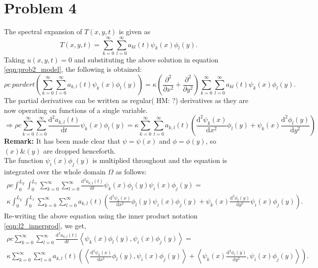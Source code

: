 \documentclass[12pt]{article}
\newcommand{\HM}[1]{{\color{green} HM: #1}}
\newcommand{\parder}[2]{\frac{\partial #1}{\partial #2}}
\newcommand{\der}[2]{\frac{\mathrm{d} #1}{\mathrm{d} #2}}
\newcommand{\dotprod}[2]{\left\langle #1, #2 \right\rangle}
\begin{document}
\section*{Problem 4}
The spectral expansion of $T(x,y,t)$ is given as
\begin{equation}
T(x,y,t) = \sum_{k=0}^\infty\sum_{l=0}^\infty a_{kl}(t)\psi_k(x)\phi_l(y).
\end{equation}
Taking $u(x,y,t) = 0$ and substituting the above solution in equation \eqref{eqn:prob2_model}, the following is obtained:
\begin{equation}
\rho c\ parder{ }{t} \left(\sum_{k=0}^\infty\sum_{l=0}^\infty a_{k,l}(t)\psi_k(x)\phi_l(y)\right) = \kappa \left(\parder{^2}{x^2} + \parder{^2}{y^2}\right)\sum_{k=0}^\infty\sum_{l=0}^\infty a_{kl}(t)\psi_k(x)\phi_l(y).
\end{equation}
The partial derivatives can be written as regular(\HM{?}) derivatives as they are now operating on functions of a single variable.
\begin{equation}
\Rightarrow \rho c \sum_{k=0}^\infty\sum_{l=0}^\infty \der{^2 a_{k,l}(t)}{t} \psi_k(x)\phi_l(y) = \kappa \sum_{k=0}^\infty\sum_{l=0}^\infty a_{k,l}(t) \left(\der{^2 \psi_{k}(x)}{x^2}\phi_l(y) + \psi_k(x)\der{^2\phi_l(y)}{y^2}\right)
\end{equation}
\textbf{Remark:} It has been made clear that $\psi = \psi(x)$ and $\phi = \phi(y)$, so $(x) \& (y)$ are dropped henceforth.\\
The function $\psi_i(x)\phi_j(y)$ is multiplied throughout and the equation is integrated over the whole domain $\Omega$ as follows:
\begin{multline}
\rho c \int_{0}^{L_y}\int_0^{L_x}\sum_{k=0}^\infty\sum_{l=0}^\infty \der{^2 a_{k,l}(t)}{t} \psi_k(x)\phi_l(y) \psi_i(x)\phi_j(y) = \\ \kappa \int_{0}^{L_y}\int_0^{L_x} \sum_{k=0}^\infty\sum_{l=0}^\infty a_{k,l}(t) \left(\der{^2 \psi_{k}(x)}{x^2}\phi_l(y)\psi_i(x)\phi_j(y) + \psi_k(x)\der{^2\phi_l(y)}{y^2}\psi_i(x)\phi_j(y)\right).
\end{multline}
Re-writing the above equation using the inner product notation \eqref{eqn:l2_innerprod}, we get, 
\begin{multline}
\rho c \sum_{k=0}^\infty\sum_{l=0}^\infty \der{^2 a_{k,l}(t)}{t} \dotprod{\psi_k(x)\phi_l(y)}{\psi_i(x)\phi_j(y)} = \\ \kappa \sum_{k=0}^\infty\sum_{l=0}^\infty a_{k,l}(t) \left(\dotprod{\der{^2 \psi_{k}(x)}{x^2}\phi_l(y)}{\psi_i(x)\phi_j(y)} + \dotprod{\psi_k(x)\der{^2\phi_l(y)}{y^2}}{\psi_i(x)\phi_j(y)}\right).
\end{multline}
 

\pagebreak
\appendix
\end{document}

